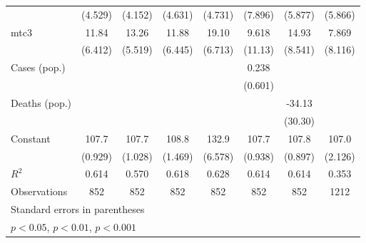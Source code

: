 \documentclass{article}
\begin{document}
{\begin{longtable}{l*{7}{c}}
                &  (4.529)         &  (4.152)         &  (4.631)         &  (4.731)         &  (7.896)         &  (5.877)         &  (5.866)         \\
mtc3            &    11.84         &    13.26         &    11.88         &    19.10\sym{*}  &    9.618         &    14.93         &    7.869         \\
                &  (6.412)         &  (5.519)         &  (6.445)         &  (6.713)         &  (11.13)         &  (8.541)         &  (8.116)         \\
Cases (pop.)    &                  &                  &                  &                  &    0.238         &                  &                  \\
                &                  &                  &                  &                  &  (0.601)         &                  &                  \\
Deaths (pop.)   &                  &                  &                  &                  &                  &   -34.13         &                  \\
                &                  &                  &                  &                  &                  &  (30.30)         &                  \\
Constant        &    107.7\sym{***}&    107.7\sym{***}&    108.8\sym{***}&    132.9\sym{***}&    107.7\sym{***}&    107.8\sym{***}&    107.0\sym{***}\\
                &  (0.929)         &  (1.028)         &  (1.469)         &  (6.578)         &  (0.938)         &  (0.897)         &  (2.126)         \\
\hline
\(R^{2}\)       &    0.614         &    0.570         &    0.618         &    0.628         &    0.614         &    0.614         &    0.353         \\
Observations    &      852         &      852         &      852         &      852         &      852         &      852         &     1212         \\
\hline\hline
\multicolumn{8}{l}{\footnotesize Standard errors in parentheses}\\
\multicolumn{8}{l}{\footnotesize \sym{*} \(p<0.05\), \sym{**} \(p<0.01\), \sym{***} \(p<0.001\)}\\
\end{longtable}
}
\end{document}
